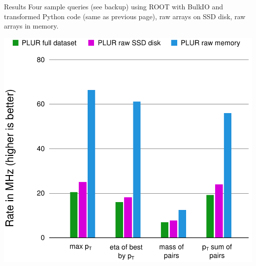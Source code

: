 \documentclass{beamer}
\begin{document}
\begin{frame}{Results}
\vspace{0.5 cm}
Four sample queries (see backup) using \textcolor{results4}{ROOT with BulkIO and transformed Python code} (same as previous page), \textcolor{results5}{raw arrays on SSD disk}, \textcolor{results6}{raw arrays in memory}.

\begin{center}
\includegraphics[width=0.65\linewidth]{physical-media.pdf}
\end{center}
\end{frame}



\end{document}
